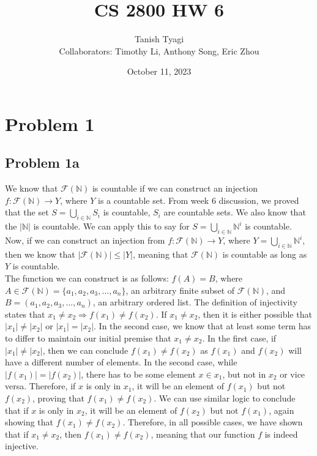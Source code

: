 \documentclass{article}
\title{\textbf{CS 2800 HW 6}}
\author{Tanish Tyagi \\ Collaborators: Timothy Li, Anthony Song, Eric Zhou}
\date{October 11, 2023}
\begin{document}
\maketitle

\section{Problem 1}

\subsection{Problem 1a}

We know that $\mathcal{F}(\mathbb{N})$ is countable if we can construct an injection $f: \mathcal{F}(\mathbb{N}) \rightarrow Y$, where $Y$ is a countable set. From week 6 discussion, we proved that the set $S = \bigcup_{i \in \mathbb{N}} S_{i}$ is countable, $S_i$ are countable sets. We also know that the $|\mathbb{N}|$ is countable. We can apply this to say for $S = \bigcup_{i \in \mathbb{N}} \mathbb{N}^i$ is countable. \\

Now, if we can construct an injection from $f: \mathcal{F}(\mathbb{N}) \rightarrow Y$, where $Y =\bigcup_{i \in \mathbb{N}} \mathbb{N}^i$, then we know that $|\mathcal{F}(\mathbb{N})| \le |Y|$, meaning that $\mathcal{F}(\mathbb{N})$ is countable as long as $Y$ is countable. \\

The function we can construct is as follows: $f(A) = B$, where $A \in \mathcal{F}(\mathbb{N}) = \{a_1, a_2, a_3, ..., a_n\}$, an arbitrary finite subset of $\mathcal{F}(\mathbb{N})$, and $B = (a_1, a_2, a_3, ..., a_n)$, an arbitrary ordered list. The definition of injectivity states that $x_1 \neq x_2 \Rightarrow f(x_1) \neq f(x_2)$. If $x_1 \neq x_2$, then it is either possible that $|x_1| \neq |x_2|$ or $|x_1| = |x_2|$. In the second case, we know that at least some term has to differ to maintain our initial premise that $x_1 \neq x_2$. In the first case, if $|x_1| \neq |x_2|$, then we can conclude $f(x_1) \neq f(x_2)$ as $f(x_1)$ and $f(x_2)$ will have a different number of elements. In the second case, while $|f(x_1)| = |f(x_2)|$, there has to be some element $x \in x_1$, but not in $x_2$ or vice versa. Therefore, if $x$ is only in $x_1$, it will be an element of $f(x_1)$ but not $f(x_2)$, proving that $f(x_1) \neq f(x_2)$. We can use similar logic to conclude that if $x$ is only in $x_2$, it will be an element of $f(x_2)$ but not $f(x_1)$, again showing that $f(x_1) \neq f(x_2)$. Therefore, in all possible cases, we have shown that if $x_1 \neq x_2$, then $f(x_1) \neq f(x_2)$, meaning that our function $f$ is indeed injective. \\
\end{document}
